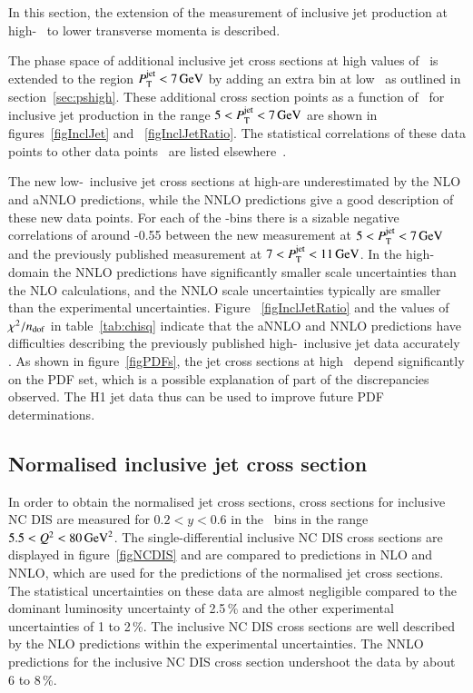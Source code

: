 \documentclass[12pt]{article}
\begin{document}
In this section, the extension of the measurement of inclusive jet production at high-\Qsq~\cite{H1Multijets} to lower transverse momenta is described. 

The phase space of additional inclusive jet cross sections at high values of \Qsq\ is extended to the region $\ptjet<7\,\GeV$ by adding an extra bin at low \ptjet\ as outlined in section~\ref{sec:pshigh}.
These additional cross section points as a function of \Qsq\ for
inclusive jet production in the range
$5<\ptjet<7\,\GeV$
are shown in figures~\ref{figInclJet} and ~\ref{figInclJetRatio}.
The statistical correlations of these data points to other data points~\cite{H1Multijets} 
are listed elsewhere~\cite{results}.

The new low-\ptjet\ inclusive jet cross sections at high-\Qsq are underestimated by the 
NLO and aNNLO predictions, while the NNLO predictions give a good description of these new data points.
For each of the \Qsq-bins there is a sizable negative correlations of around -0.55 between the new measurement at $5<\ptjet<7\,\GeV$ and the previously published measurement at $7<\ptjet<11\,\GeV$.
In the high-\Qsq domain 
the NNLO predictions have significantly smaller scale uncertainties 
than the NLO calculations, and the NNLO scale uncertainties typically are smaller than the experimental uncertainties.
Figure ~\ref{figInclJetRatio} and
the values of $\chisq/\ndf$ in table~\ref{tab:chisq} indicate that the aNNLO and NNLO predictions
have difficulties describing the previously published
high-\Qsq\ inclusive jet data \cite{H1Multijets} accurately \cite{NNLO}.
As shown in figure~\ref{figPDFs}, the jet cross sections at high
\ptjet\ depend significantly on the PDF set, which is a possible
explanation of part of the discrepancies observed.
The H1 jet
data thus can be used to improve future PDF determinations.

\subsection{Normalised inclusive jet cross section}
\label{sec:NormIjets}
In order to obtain the normalised jet cross sections, cross sections for inclusive NC DIS 
are measured for $0.2<y<0.6$ in the \Qsq\ bins in the range $5.5<\Qsq<80\,\GeVsq$.
The single-differential inclusive NC DIS cross sections are displayed in figure~\ref{figNCDIS} 
and are compared to predictions in NLO and NNLO, which are used for the predictions of the normalised jet cross sections.
The statistical uncertainties on these data are almost negligible compared to the dominant 
luminosity uncertainty of 2.5\,\% and the other experimental uncertainties of 1 to 2\,\%.
The inclusive NC DIS cross sections are well described by the NLO predictions within the experimental uncertainties. 
The NNLO predictions for the inclusive NC DIS cross section undershoot the data by about 6 to 8\,\%. 
\end{document}
